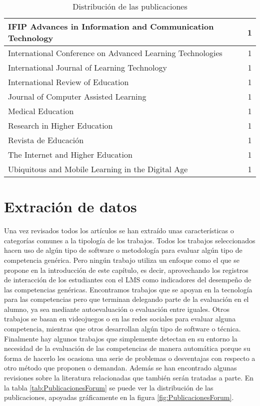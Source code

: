 \begin{table}[H]
\begin{center}
\begin{tabular}{| m{12cm} | c |}
    \hline
    IFIP Advances in Information and Communication Technology & 1\\
    \hline
    International Conference on Advanced Learning Technologies & 1\\
    \hline
    International Journal of Learning Technology & 1\\
    \hline
    International Review of Education & 1\\
    \hline
    Journal of Computer Assisted Learning & 1\\
    \hline
    Medical Education & 1\\
    \hline
    Research in Higher Education & 1\\
    \hline
    Revista de Educación & 1\\
    \hline
    The Internet and Higher Education & 1\\
    \hline
    Ubiquitous and Mobile Learning in the Digital Age & 1 \\
    \hline
  \end{tabular}
\end{center}
\caption{Distribución de las publicaciones}
\label{tab:DistribucionPublicaciones}
\end{table} 



\section{Extración de datos}

Una vez revisados todos los artículos se han extraído unas características o categorías comunes a la tipología de los trabajos. Todos los trabajos seleccionados hacen uso de algún tipo de software o metodología para evaluar algún tipo de competencia genérica. Pero ningún trabajo utiliza un enfoque como el que se propone en la introducción de este capítulo, es decir, aprovechando los registros de interacción de los estudiantes con el LMS como indicadores del desempeño de las competencias genéricas. Encontramos trabajos que se apoyan en la tecnología para las competencias pero que terminan delegando parte de la evaluación en el alumno, ya sea mediante autoevaluación o evaluación entre iguales. Otros trabajos se basan en videojuegos o en las redes sociales para evaluar alguna competencia, mientras que otros desarrollan algún tipo de software o técnica. Finalmente hay algunos trabajos que simplemente detectan en su entorno la necesidad de la evaluación de las competencias de manera automática porque su forma de hacerlo les ocasiona una serie de problemas o desventajas con respecto a otro método que proponen o demandan. Además se han encontrado algunas revisiones sobre la literatura relacionadas que también serán tratadas a parte.  En la tabla \ref{tab:PublicacionesForum} se puede ver la distribución de las publicaciones, apoyadas gráficamente en la figura  \ref{fig:PublicacionesForum}.

